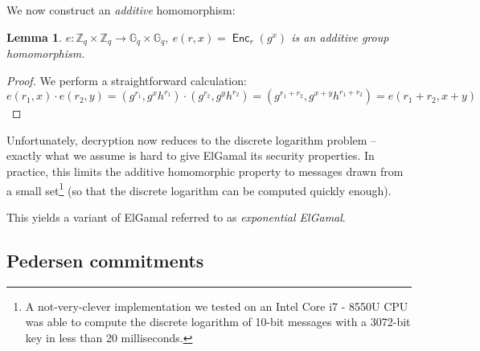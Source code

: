 \documentclass[11pt,twoside,a4paper]{article}
\DeclareMathOperator{\Enc}{\mathsf{Enc}}
\newtheorem{lemma}[theorem]{Lemma}
\theoremstyle{definition}
\begin{document}
We now construct an \textit{additive} homomorphism:
\begin{lemma}
    \(e:\mathbb{Z}_q\times\mathbb{Z}_q\rightarrow\mathbb{G}_q\times\mathbb{G}_q,\ e(r, x)=\Enc_r(g^x)\) is an additive group homomorphism.
\end{lemma}
\begin{proof}
    We perform a straightforward calculation:
    \[e(r_1, x)\cdot e(r_2,y)=(g^{r_1},g^xh^{r_1})\cdot(g^{r_2},g^yh^{r_2})=(g^{r_1+r_2},g^{x+y}h^{r_1+r_2})=e(r_1+r_2, x+y)\]
\end{proof}
Unfortunately, decryption now reduces to the discrete logarithm problem -- exactly what we assume is hard to give ElGamal its security properties. In practice, this limits the additive homomorphic property to messages drawn from a small set\footnote{A not-very-clever implementation we tested on an Intel Core i7 - 8550U CPU was able to compute the discrete logarithm of 10-bit messages with a 3072-bit key in less than 20 milliseconds.} (so that the discrete logarithm can be computed quickly enough).

This yields a variant of ElGamal referred to as \textit{exponential ElGamal}.
\subsection{Pedersen commitments}
\end{document}
